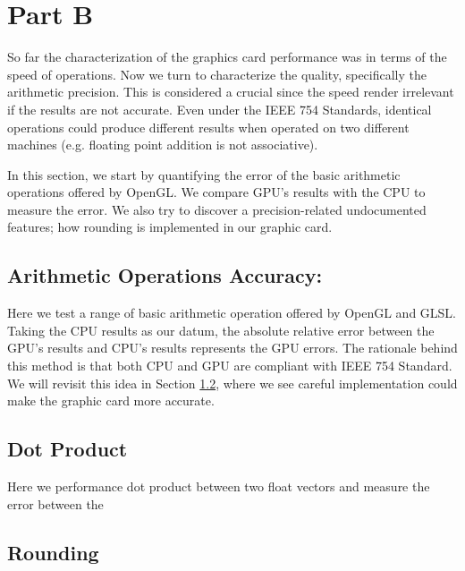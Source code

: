 \section{Part B}
So far the characterization of the graphics card performance was in terms of the speed of operations. Now we turn to characterize the quality, specifically the arithmetic precision. This is considered a crucial since the speed render irrelevant if the results are not accurate. Even under the IEEE 754 Standards, identical operations could produce different results when operated on two different machines (e.g. floating point addition is not associative). 

In this section, we start by quantifying the error of the basic arithmetic operations offered by OpenGL. We compare GPU's results with the CPU to measure the error. We also try to discover a precision-related undocumented features; how rounding is implemented in our graphic card. 

\subsection{Arithmetic Operations Accuracy:}
Here we test a range of basic arithmetic operation offered by OpenGL and GLSL. Taking the CPU results as our datum, the absolute relative error between the GPU's results and CPU's results represents the GPU errors. The rationale behind this method is that both CPU and GPU are compliant with IEEE 754 Standard. We will revisit this idea in Section \ref{sec:dot}, where we see careful implementation could make the graphic card more accurate. 

\subsection{Dot Product}\label{sec:dot}
Here we performance dot product between two float vectors and measure the error between the 
\cite{whitehead2011precision}

\subsection{Rounding}



